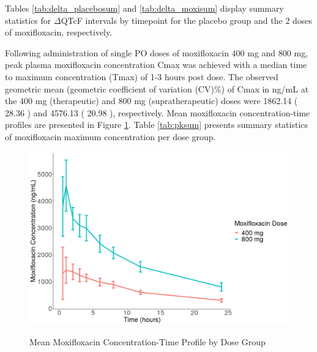 \documentclass[
]{article}
\begin{document}
Tables \ref{tab:delta_placebosum} and \ref{tab:delta_moxisum} display
summary statistics for \(\Delta\)QTcF intervals by timepoint for the
placebo group and the 2 doses of moxifloxacin, respectively.

\clearpage

\captionsetup{justification = RaggedRight,singlelinecheck=false}


\label{tab:delta_placebosum}

\clearpage

\captionsetup{justification = RaggedRight,singlelinecheck=false}


\label{tab:delta_moxisum}

\clearpage

Following administration of single PO doses of moxifloxacin 400 mg and
800 mg, peak plasma moxifloxacin concentration Cmax was achieved with a
median time to maximum concentration (Tmax) of 1-3 hours post dose. The
observed geometric mean (geometric coefficient of variation (CV)\%) of
Cmax in ng/mL at the 400 mg (therapeutic) and 800 mg (supratherapeutic)
doses were 1862.14 ( 28.36 ) and 4576.13 ( 20.98 ), respectively. Mean
moxifloxacin concentration-time profiles are presented in Figure
\ref{fig:PKprofiles}. Table \ref{tab:pksum} presents summary statistics
of moxifloxacin maximum concentration per dose group.

\begin{figure}[H]
\caption{Mean Moxifloxacin Concentration-Time Profile by Dose Group} 
\includegraphics[width=\textwidth]{../Report/Figures/PKprofiles.png}
\label{fig:PKprofiles}
\end{figure}
\end{document}
